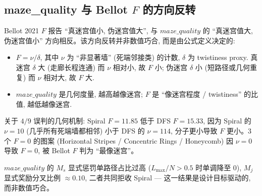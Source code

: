 \subsection{maze\_quality 与 Bellot $F$ 的方向反转}

Bellot 2021 $F$ \cite{bellot2021} 报告 ``真迷宫值小, 伪迷宫值大'', 与 $maze\_quality$ 的 ``真迷宫值大, 伪迷宫值小'' 方向相反。该方向反转并非数值巧合, 而是由公式定义决定的:
\begin{itemize}[leftmargin=*, itemsep=0pt, topsep=0pt]
  \item $F = \nu / \delta$, 其中 $\nu$ 为 ``非显著墙'' (死端邻接类) 的计数, $\delta$ 为 twistiness proxy. 真迷宫 $\delta$ 大 (走廊长程连通) 而 $\nu$ 相对小, 故 $F$ 小; 伪迷宫 $\delta$ 小 (短路径或几何重复) 而 $\nu$ 相对大, 故 $F$ 大.
  \item $maze\_quality$ 是几何度量, 越高越像迷宫; $F$ 是 ``像迷宫程度 / twistiness'' 的比值, 越低越像迷宫.
\end{itemize}

关于 $4/9$ 误判的几何机制: Spiral $F = 11.85$ 低于 DFS $F = 15.33$, 因为 Spiral 的 $\nu = 10$ (几乎所有死端墙都相邻) 小于 DFS 的 $\nu = 114$, 分子更小导致 $F$ 更小。3 个 $F = 0$ 的图案 (Horizontal Stripes / Concentric Rings / Honeycomb) 因 $\nu = 0$ 导致 $F = 0$, 被 Bellot $F$ 判为 ``最像迷宫''。

$maze\_quality$ 的 $M_s$ 显式惩罚单路径占比过高 ($L_{\max}/N > 0.5$ 时单调降至 0), $M_j$ 显式奖励分叉比例 $\approx 0.10$, 二者共同拒收 Spiral --- 这一结果是设计目标驱动的, 而非数值巧合。
